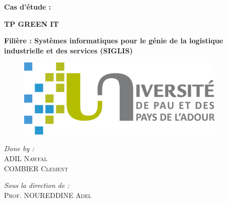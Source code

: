 \documentclass[12pt, a4paper]{report}
\begin{document}
\begin{titlepage}

	
	\begin{center}
		
		{ \Huge \bfseries Cas d'étude :}
  
		\vspace{1cm}
  
        {\bfseries\Huge TP GREEN IT}
		
		
		\vspace*{1cm}

        \hfill

	    
		\Large \textbf{Filière : Systèmes informatiques pour le génie de la logistique industrielle et des services (SIGLIS)}\\

        \vspace{2cm}

       
  
  
        \begin{figure}[H]
        \centering
            \includegraphics[width=10cm]{uppa.png}
        \end{figure}



        \end{center}

\vspace{3cm}


\begin{minipage}{0.4\textwidth}
\begin{flushleft} \large
\emph{Done by :}\\[0.5 cm]
ADIL \textsc{Nawfal}\\
COMBIER \textsc{Clement}\\





\end{flushleft}
\end{minipage}
\hfill
\begin{minipage}{0.5\textwidth}
\begin{flushright} \large
\emph{Sous la direction de :} \\[0.5 cm]
\textsc{Prof. NOUREDDINE \textsc{Adel}}\\





\end{flushright}
\end{minipage}
\end{titlepage}
\end{document}
